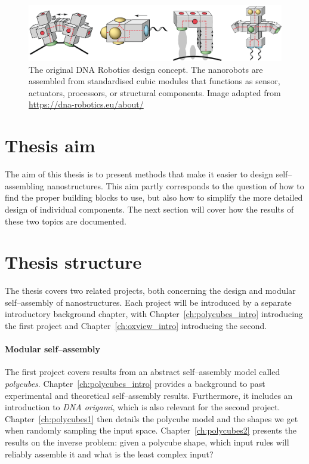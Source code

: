 \begin{figure}
    \centering\includegraphics[width=\textwidth]{figures/dnaRoboticsHeader.png} 
    \caption{The original DNA Robotics design concept. The nanorobots are assembled from standardised cubic modules that functions as sensor, actuators, processors, or structural components. Image adapted from \url{https://dna-robotics.eu/about/}}
    \label{fig:dnaRoboticsHeader}
\end{figure}



\section{Thesis aim}
The aim of this thesis is to present methods that make it easier to design self--assembling nanostructures. This aim partly corresponds to the question of how to find the proper building blocks to use, but also how to simplify the more detailed design of individual components. The next section will cover how the results of these two topics are documented.

\section{Thesis structure}
The thesis covers two related projects, both concerning the design and modular self--assembly of nanostructures. Each project will be introduced by a separate introductory background chapter, with Chapter~\ref{ch:polycubes_intro} introducing the first project and Chapter~\ref{ch:oxview_intro} introducing the second.

\paragraph{Modular self--assembly}
The first project covers results from an abstract self--assembly model called \emph{polycubes}. Chapter~\ref{ch:polycubes_intro} provides a background to past experimental and theoretical self--assembly results. Furthermore, it includes an introduction to \emph{DNA origami}, which is also relevant for the second project. Chapter~\ref{ch:polycubes1} then details the polycube model and the shapes we get when randomly sampling the input space. Chapter~\ref{ch:polycubes2} presents the results on the inverse problem: given a polycube shape, which input rules will reliably assemble it and what is the least complex input?

